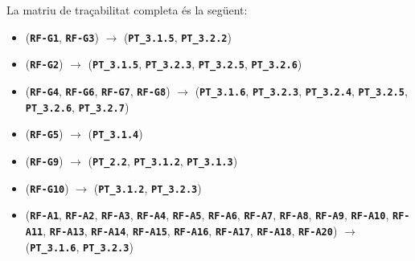 \documentclass[a4paper,12pt]{ThesisStyle}
\begin{document}
La matriu de traçabilitat completa és la següent:
\begin{itemize}
  \item (\texttt{\textbf{RF-G1}}, \texttt{\textbf{RF-G3}}) \hspace{1pt} $\longrightarrow$ \hspace{1pt} (\texttt{\textbf{PT\_3.1.5}}, \texttt{\textbf{PT\_3.2.2}})
  \item (\texttt{\textbf{RF-G2}}) \hspace{1pt} $\longrightarrow$ \hspace{1pt} (\texttt{\textbf{PT\_3.1.5}}, \texttt{\textbf{PT\_3.2.3}}, \texttt{\textbf{PT\_3.2.5}}, \texttt{\textbf{PT\_3.2.6}})
  \item (\texttt{\textbf{RF-G4}}, \texttt{\textbf{RF-G6}}, \texttt{\textbf{RF-G7}}, \texttt{\textbf{RF-G8}}) \hspace{1pt} $\longrightarrow$ \hspace{1pt} (\texttt{\textbf{PT\_3.1.6}}, \texttt{\textbf{PT\_3.2.3}}, \texttt{\textbf{PT\_3.2.4}}, \texttt{\textbf{PT\_3.2.5}}, \texttt{\textbf{PT\_3.2.6}}, \texttt{\textbf{PT\_3.2.7}})
  \item (\texttt{\textbf{RF-G5}}) \hspace{1pt} $\longrightarrow$ \hspace{1pt} (\texttt{\textbf{PT\_3.1.4}})
  \item (\texttt{\textbf{RF-G9}}) \hspace{1pt} $\longrightarrow$ \hspace{1pt} (\texttt{\textbf{PT\_2.2}}, \texttt{\textbf{PT\_3.1.2}}, \texttt{\textbf{PT\_3.1.3}})
  \item (\texttt{\textbf{RF-G10}}) \hspace{1pt} $\longrightarrow$ \hspace{1pt} (\texttt{\textbf{PT\_3.1.2}}, \texttt{\textbf{PT\_3.2.3}})
  \item (\texttt{\textbf{RF-A1}}, \texttt{\textbf{RF-A2}}, \texttt{\textbf{RF-A3}}, \texttt{\textbf{RF-A4}}, \texttt{\textbf{RF-A5}}, \texttt{\textbf{RF-A6}}, \texttt{\textbf{RF-A7}}, \texttt{\textbf{RF-A8}}, \texttt{\textbf{RF-A9}}, \texttt{\textbf{RF-A10}}, \texttt{\textbf{RF-A11}}, \texttt{\textbf{RF-A13}}, \texttt{\textbf{RF-A14}}, \texttt{\textbf{RF-A15}}, \texttt{\textbf{RF-A16}}, \texttt{\textbf{RF-A17}}, \texttt{\textbf{RF-A18}}, \texttt{\textbf{RF-A20}}) \hspace{1pt} $\longrightarrow$ \hspace{1pt} (\texttt{\textbf{PT\_3.1.6}}, \texttt{\textbf{PT\_3.2.3}})

\end{itemize}
\end{document}
